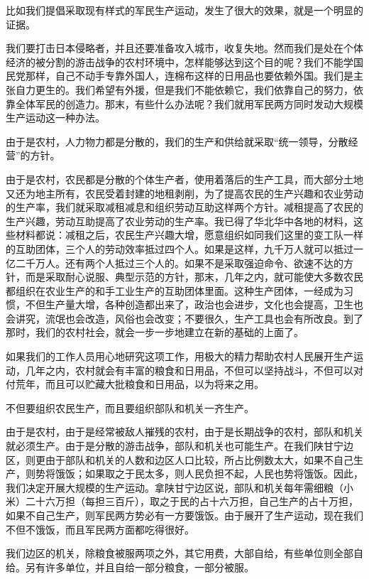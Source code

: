 比如我们提倡采取现有样式的军民生产运动，发生了很大的效果，就是一个明显的证据。

我们要打击日本侵略者，并且还要准备攻入城市，收复失地。然而我们是处在个体经济的被分割的游击战争的农村环境中，怎样能够达到这个目的呢？我们不能学国民党那样，自己不动手专靠外国人，连棉布这样的日用品也要依赖外国。我们是主张自力更生的。我们希望有外援，但是我们不能依赖它，我们依靠自己的努力，依靠全体军民的创造力。那末，有些什么办法呢？我们就用军民两方同时发动大规模生产运动这一种办法。

由于是农村，人力物力都是分散的，我们的生产和供给就采取“统一领导，分散经营”的方针。

由于是农村，农民都是分散的个体生产者，使用着落后的生产工具，而大部分土地又还为地主所有，农民受着封建的地租剥削，为了提高农民的生产兴趣和农业劳动的生产率，我们就采取减租减息和组织劳动互助这样两个方针。减租提高了农民的生产兴趣，劳动互助提高了农业劳动的生产率。我已得了华北华中各地的材料，这些材料都说：减租之后，农民生产兴趣大增，愿意组织如同我们这里的变工队一样的互助团体，三个人的劳动效率抵过四个人。如果是这样，九千万人就可以抵过一亿二千万人。还有两个人抵过三个人的。如果不是采取强迫命令、欲速不达的方针，而是采取耐心说服、典型示范的方针，那末，几年之内，就可能使大多数农民都组织在农业生产的和手工业生产的互助团体里面。这种生产团体，一经成为习惯，不但生产量大增，各种创造都出来了，政治也会进步，文化也会提高，卫生也会讲究，流氓也会改造，风俗也会改变；不要很久，生产工具也会有所改良。到了那时，我们的农村社会，就会一步一步地建立在新的基础的上面了。

如果我们的工作人员用心地研究这项工作，用极大的精力帮助农村人民展开生产运动，几年之内，农村就会有丰富的粮食和日用品，不但可以坚持战斗，不但可以对付荒年，而且可以贮藏大批粮食和日用品，以为将来之用。

不但要组织农民生产，而且要组织部队和机关一齐生产。

由于是农村，由于是经常被敌人摧残的农村，由于是长期战争的农村，部队和机关就必须生产。由于是分散的游击战争，部队和机关也可能生产。在我们陕甘宁边区，则更由于部队和机关的人数和边区人口比较，所占比例数太大，如果不自己生产，则势将饿饭；如果取之于民太多，则人民负担不起，人民也势将饿饭。因此，我们决定开展大规模的生产运动。拿陕甘宁边区说，部队和机关每年需细粮（小米）二十六万担（每担三百斤），取之于民的占十六万担，自己生产的占十万担，如果不自己生产，则军民两方势必有一方要饿饭。由于展开了生产运动，现在我们不但不饿饭，而且军民两方面都吃得很好。

我们边区的机关，除粮食被服两项之外，其它用费，大部自给，有些单位则全部自给。另有许多单位，并且自给一部分粮食，一部分被服。

